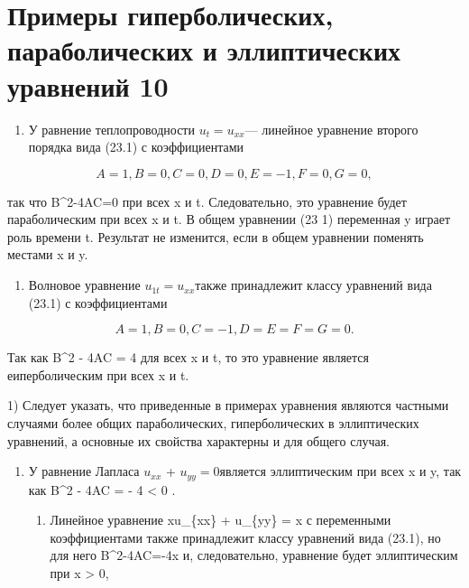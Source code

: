 \documentclass[
  ukrainian,
]{article}
\providecommand{\tightlist}{%
  \setlength{\itemsep}{0pt}\setlength{\parskip}{0pt}}
\begin{document}
\section{Примеры гиперболических, параболических и эллиптических
уравнений
10}\label{ux43fux440ux438ux43cux435ux440ux44b-ux433ux438ux43fux435ux440ux431ux43eux43bux438ux447ux435ux441ux43aux438ux445-ux43fux430ux440ux430ux431ux43eux43bux438ux447ux435ux441ux43aux438ux445-ux438-ux44dux43bux43bux438ux43fux442ux438ux447ux435ux441ux43aux438ux445-ux443ux440ux430ux432ux43dux435ux43dux438ux439-10}

\begin{enumerate}
\def\labelenumi{\arabic{enumi}.}
\tightlist
\item
  У равнение теплопроводности \(u_t = u_{xx}\)--- линейное уравнение
  второго порядка вида (23.1) с коэффициентами
\end{enumerate}

\[
A=1
,   B=0  ,   C=0  ,   D=0  ,   E=-1  ,   F=0  ,   G=0  ,
\]

так что B\^{}2-4AC=0 при всех x и t. Следовательно, это уравнение будет
параболическим при всех x и t. В общем уравнении (23 1) переменная y
играет роль времени t. Результат не изменится, если в общем уравнении
поменять местами x и y.

\begin{enumerate}
\def\labelenumi{\arabic{enumi}.}
\setcounter{enumi}{1}
\tightlist
\item
  Волновое уравнение \(u_{1t} = u_{xx}\)также принадлежит классу
  уравнений вида (23.1) с коэффициентами
\end{enumerate}

\[
A=1
,   B=0  ,   C=-1  ,   D=E=F=G=0  .
\]

Так как B\^{}2 - 4AC = 4 для всех x и t, то это уравнение является
еиперболическим при всех x и t.

1) Следует указать, что приведенные в примерах уравнения являются
частными случаями более общих параболических, гиперболических в
эллиптических уравнений, а основные их свойства характерны и для общего
случая.

\begin{enumerate}
\def\labelenumi{\arabic{enumi}.}
\setcounter{enumi}{2}
\item
  У равнение Лапласа \(u_{xx}\) + \(u_{yy} = 0\)является эллиптическим
  при всех x и y, так как B\^{}2 - 4AC = - 4 \textless{} 0 .

  \begin{enumerate}
  \def\labelenumii{\arabic{enumii}.}
  \setcounter{enumii}{3}
  \tightlist
  \item
    Линейное уравнение xu\_\{xx\} + u\_\{yy\} = \sin x с переменными
    коэффициентами также принадлежит классу уравнений вида (23.1), но
    для него B\^{}2-4AC=-4x и, следовательно, уравнение будет
    эллиптическим при x \textgreater{} 0,
  \end{enumerate}
\end{enumerate}
\end{document}
